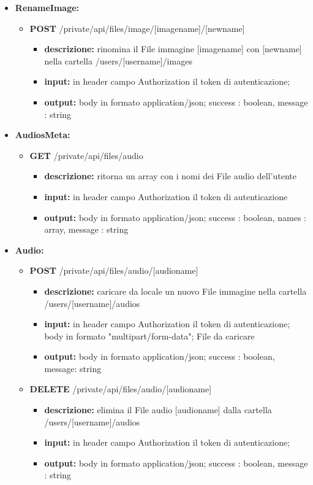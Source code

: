 {{\begin{itemize}
		\item \textbf{RenameImage:}
			\begin{itemize}
			\item   \textbf{POST} /private/api/files/image/[imagename]/[newname] 
				\begin{itemize} 
				\item \textbf{descrizione:} rinomina il File immagine [imagename] con [newname] nella cartella /users/[username]/images
				\item \textbf{input:} in header campo Authorization il token di autenticazione;
				\item \textbf{output:} body in formato application/json; success : boolean, message : string
				\end{itemize}
			\end{itemize}
			
		\item \textbf{AudiosMeta:}
			\begin{itemize}
			\item   \textbf{GET} /private/api/files/audio
				\begin{itemize} 
				\item \textbf{descrizione:} ritorna un array con i nomi dei File audio dell'utente
				\item \textbf{input:} in header campo Authorization il token di autenticazione
				\item \textbf{output:} body in formato application/json; success : boolean, names : array, message : string
				\end{itemize}
			\end{itemize}
			
		\item \textbf{Audio:}
			\begin{itemize}
			\item    \textbf{POST} /private/api/files/audio/[audioname]
				\begin{itemize} 
				\item \textbf{descrizione:} caricare da locale un nuovo File immagine nella cartella /users/[username]/audios					
				\item \textbf{input:} in header campo Authorization il token di autenticazione; body in formato "multipart/form-data"; File da caricare
				\item \textbf{output:} body in formato application/json; success : boolean,  message: string
				\end{itemize}
			\item   \textbf{DELETE} /private/api/files/audio/[audioname]
				\begin{itemize} 
				\item \textbf{descrizione:} elimina il File audio [audioname] dalla cartella /users/[username]/audios			
				\item \textbf{input:} in header campo Authorization il token di autenticazione;
				\item \textbf{output:} body in formato application/json; success : boolean, message : string
				\end{itemize}
			\end{itemize}
			

\end{itemize}}}
